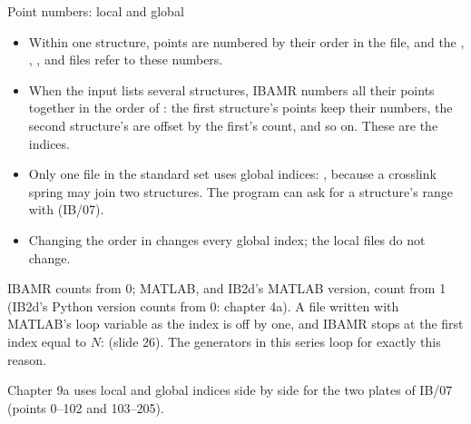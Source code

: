 \documentclass[aspectratio=169,11pt]{beamer}
\begin{document}
\begin{frame}{Point numbers: local and global}
\footnotesize
\begin{itemize}
  \item Within one structure, points are numbered  by their order in the  file, and the , , ,  and  files refer to these  numbers.
  \item When the input lists several structures, IBAMR numbers all their points together in the order of : the first structure's points keep their numbers, the second structure's are offset by the first's count, and so on. These are the  indices.
  \item Only one file in the standard set uses global indices: , because a crosslink spring may join two structures. The program can ask for a structure's range with  (IB/07).
  \item Changing the order in  changes every global index; the local files do not change.
\end{itemize}
\vspace{1mm}
\begin{punchbox}
\small IBAMR counts from 0; MATLAB, and IB2d's MATLAB version, count from 1 (IB2d's Python version counts from 0: chapter 4a). A  file written with MATLAB's loop variable as the index is off by one, and IBAMR stops at the first index equal to $N$:  (slide 26). The generators in this series loop  for exactly this reason.
\end{punchbox}
\small Chapter 9a uses local and global indices side by side for the two plates of IB/07 (points 0--102 and 103--205).
\end{frame}
\end{document}
